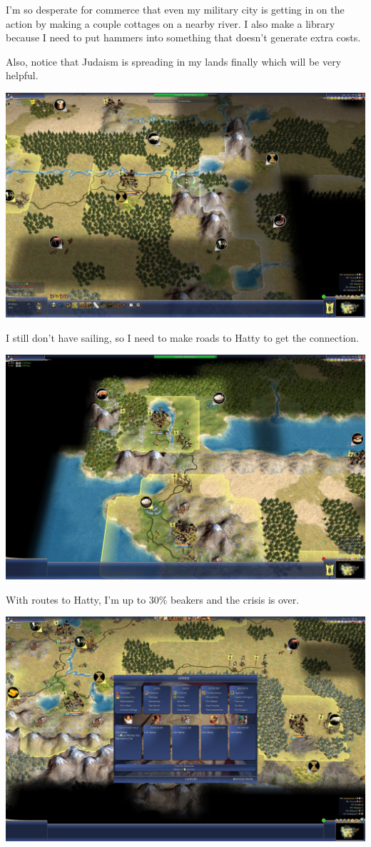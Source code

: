 \documentclass[10pt]{article}
\begin{document}
I'm so desperate for commerce that even my military city is getting in on the action by making
a couple cottages on a nearby river. I also make a library because I need to put hammers into
something that doesn't generate extra costs.

Also, notice that Judaism is spreading in my lands finally which will be very helpful.

\includegraphics[width=1.0\textwidth]{78}

I still don't have sailing, so I need to make roads to Hatty to get the connection.

\includegraphics[width=1.0\textwidth]{80}

With routes to Hatty, I'm up to 30\% beakers and the crisis is over.

\includegraphics[width=1.0\textwidth]{81}
\end{document}
